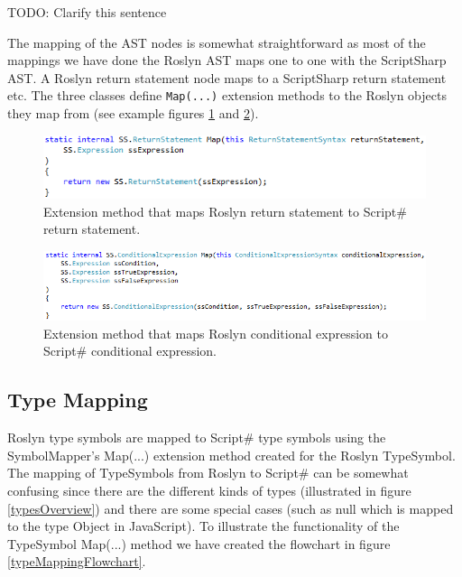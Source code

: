 		TODO: Clarify this sentence

		The mapping of the AST nodes is somewhat straightforward as most of the mappings we have done the Roslyn AST maps one to one with the ScriptSharp AST. A Roslyn return statement node maps to a ScriptSharp return statement etc. The three classes define \texttt{Map(...)} extension methods to the Roslyn objects they map from (see example figures \ref{returnStatementMap} and \ref{conditionaleExpressionMap}).

		\begin{figure}[H]
			\begin{center}
				\centerline{\includegraphics[width=14cm]{resources/images/ReturnStatementMap.png}}
			\end{center}
			\caption{Extension method that maps Roslyn return statement to Script\# return statement.}
			\label{returnStatementMap}
		\end{figure}

		\begin{figure}[H]
			\begin{center}
				\centerline{\includegraphics[width=14cm]{resources/images/ConditionalExpressionMap.png}}
			\end{center}
			\caption{Extension method that maps Roslyn conditional expression to Script\# conditional expression.}
			\label{conditionaleExpressionMap}
		\end{figure}

	\subsection{Type Mapping} %
	\label{sub:type_mapping}
		Roslyn type symbols are mapped to Script\# type symbols using the SymbolMapper’s Map(...) extension method created for the Roslyn TypeSymbol. The mapping of TypeSymbols from Roslyn to Script\# can be somewhat confusing since there are the different kinds of types (illustrated in figure \ref{typesOverview}) and there are some special cases (such as null which is mapped to the type Object in JavaScript). To illustrate the functionality of the TypeSymbol Map(...) method we have created the flowchart in figure \ref{typeMappingFlowchart}.

